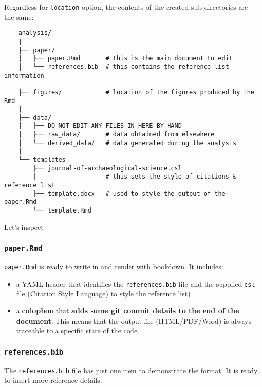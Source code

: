 \documentclass[
  letterpaper,
  DIV=11,
  numbers=noendperiod]{scrreprt}
\begin{document}
Regardless for \texttt{location} option, the contents of the created
sub-directories are the same:

\begin{verbatim}
    analysis/
    |
    ├── paper/
    │   ├── paper.Rmd       # this is the main document to edit
    │   └── references.bib  # this contains the reference list information
    
    ├── figures/            # location of the figures produced by the Rmd
    |
    ├── data/
    │   ├── DO-NOT-EDIT-ANY-FILES-IN-HERE-BY-HAND
    │   ├── raw_data/       # data obtained from elsewhere
    │   └── derived_data/   # data generated during the analysis
    |
    └── templates
        ├── journal-of-archaeological-science.csl
        |                   # this sets the style of citations & reference list
        ├── template.docx   # used to style the output of the paper.Rmd
        └── template.Rmd
\end{verbatim}

Let's inspect

\hypertarget{paper.rmd}{%
\subsubsection{\texorpdfstring{\texttt{paper.Rmd}}{paper.Rmd}}\label{paper.rmd}}

\texttt{paper.Rmd} is ready to write in and render with bookdown. It
includes:

\begin{itemize}
\item
  a YAML header that identifies the \texttt{references.bib} file and the
  supplied \texttt{csl} file (Citation Style Language) to style the
  reference list)
\item
  a \textbf{colophon} that \textbf{adds some git commit details to the
  end of the document}. This means that the output file (HTML/PDF/Word)
  is always traceable to a specific state of the code.
\end{itemize}

\hypertarget{references.bib}{%
\subsubsection{\texorpdfstring{\texttt{references.bib}}{references.bib}}\label{references.bib}}

The \texttt{references.bib} file has just one item to demonstrate the
format. It is ready to insert more reference details.
\end{document}
